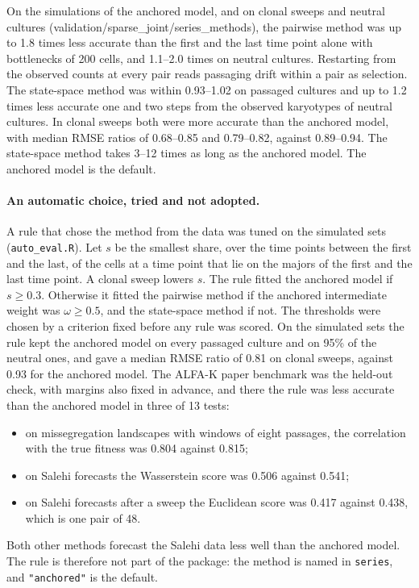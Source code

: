 \documentclass[11pt]{article}
\begin{document}
On the simulations of the anchored model, and on clonal sweeps and neutral
cultures (validation/sparse\_joint/series\_methods), the pairwise method was
up to 1.8 times less accurate than the first and the last time point alone with
bottlenecks of 200 cells, and 1.1--2.0 times on neutral cultures. Restarting
from the observed counts at every pair reads passaging drift within a pair as
selection. The state-space method was within 0.93--1.02 on passaged cultures
and up to 1.2 times less accurate one and two steps from the observed
karyotypes of neutral cultures. In clonal sweeps both were more accurate
than the anchored model, with median RMSE ratios of 0.68--0.85 and 0.79--0.82,
against 0.89--0.94. The state-space method takes 3--12 times as long as the
anchored model. The anchored model is the default.

\paragraph{An automatic choice, tried and not adopted.}
A rule that chose the method from the data was tuned on the simulated sets
(\texttt{auto\_eval.R}). Let $s$ be the smallest share, over the time points
between the first and the last, of the cells at a time point that lie on the
majors of the first and the last time point. A clonal sweep lowers $s$. The
rule fitted the anchored model if $s\ge0.3$. Otherwise it fitted the pairwise
method if the anchored intermediate weight was $\omega\ge0.5$, and the
state-space method if not. The thresholds were chosen by a criterion fixed
before any rule was scored. On the simulated sets the rule kept the anchored
model on every passaged culture and on 95\% of the neutral ones, and gave a
median RMSE ratio of 0.81 on clonal sweeps, against 0.93 for the anchored
model. The ALFA-K paper benchmark was the held-out check, with margins also
fixed in advance, and there the rule was less accurate than the anchored
model in three of 13 tests:
\begin{itemize}
\item on missegregation landscapes with windows of eight passages, the
  correlation with the true fitness was 0.804 against 0.815;
\item on Salehi forecasts the Wasserstein score was 0.506 against 0.541;
\item on Salehi forecasts after a sweep the Euclidean score was 0.417 against
  0.438, which is one pair of 48.
\end{itemize}
Both other methods forecast the Salehi data less well than the anchored model.
The rule is therefore not part of the package: the method is named in
\texttt{series}, and \texttt{"anchored"} is the default.
\end{document}
